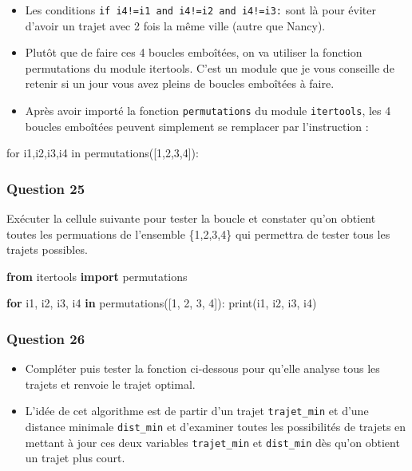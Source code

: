 \documentclass[
  paper=a4,
  ,captions=tableheading
]{scrartcl}
\newenvironment{Shaded}{}{}
\newcommand{\BuiltInTok}[1]{\textcolor[rgb]{0.00,0.50,0.00}{#1}}
\newcommand{\ControlFlowTok}[1]{\textcolor[rgb]{0.00,0.44,0.13}{\textbf{#1}}}
\newcommand{\DecValTok}[1]{\textcolor[rgb]{0.25,0.63,0.44}{#1}}
\newcommand{\ImportTok}[1]{\textcolor[rgb]{0.00,0.50,0.00}{\textbf{#1}}}
\newcommand{\KeywordTok}[1]{\textcolor[rgb]{0.00,0.44,0.13}{\textbf{#1}}}
\newcommand{\NormalTok}[1]{#1}
\providecommand{\tightlist}{%
  \setlength{\itemsep}{0pt}\setlength{\parskip}{0pt}}
\begin{document}
\begin{itemize}
\tightlist
\item
  Les conditions \texttt{if\ i4!=i1\ and\ i4!=i2\ and\ i4!=i3:} sont là
  pour éviter d'avoir un trajet avec 2 fois la même ville (autre que
  Nancy).
\item
  Plutôt que de faire ces 4 boucles emboîtées, on va utiliser la
  fonction permutations du module itertools. C'est un module que je vous
  conseille de retenir si un jour vous avez pleins de boucles emboîtées
  à faire.
\item
  Après avoir importé la fonction \texttt{permutations} du module
  \texttt{itertools}, les 4 boucles emboîtées peuvent simplement se
  remplacer par l'instruction :
\end{itemize}

\begin{Shaded}
\begin{Highlighting}[]
\NormalTok{for i1,i2,i3,i4 in permutations([1,2,3,4]):}
\end{Highlighting}
\end{Shaded}

\hypertarget{question-25}{%
\subsubsection{Question 25}\label{question-25}}

Exécuter la cellule suivante pour tester la boucle et constater qu'on
obtient toutes les permuations de l'ensemble \{1,2,3,4\} qui permettra
de tester tous les trajets possibles.

\begin{Shaded}
\begin{Highlighting}[]
\ImportTok{from}\NormalTok{ itertools }\ImportTok{import}\NormalTok{ permutations}

\ControlFlowTok{for}\NormalTok{ i1, i2, i3, i4 }\KeywordTok{in}\NormalTok{ permutations([}\DecValTok{1}\NormalTok{, }\DecValTok{2}\NormalTok{, }\DecValTok{3}\NormalTok{, }\DecValTok{4}\NormalTok{]):}
    \BuiltInTok{print}\NormalTok{(i1, i2, i3, i4)}
\end{Highlighting}
\end{Shaded}

\hypertarget{question-26}{%
\subsubsection{Question 26}\label{question-26}}

\begin{itemize}
\item
  Compléter puis tester la fonction ci-dessous pour qu'elle analyse tous
  les trajets et renvoie le trajet optimal.
\item
  L'idée de cet algorithme est de partir d'un trajet
  \texttt{trajet\_min} et d'une distance minimale \texttt{dist\_min} et
  d'examiner toutes les possibilités de trajets en mettant à jour ces
  deux variables \texttt{trajet\_min} et \texttt{dist\_min} dès qu'on
  obtient un trajet plus court.
\end{itemize}
\end{document}
